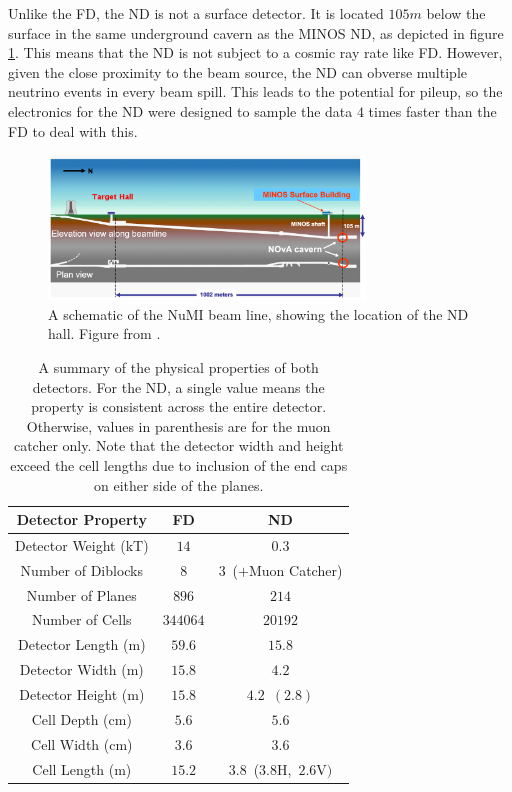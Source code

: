 Unlike the FD, the ND is not a surface detector. It is located $105\unit{m}$ below the surface in the same underground cavern as the MINOS ND, as depicted in figure \ref{fig:DetNDPlan}. This means that the ND is not subject to a cosmic ray rate like FD. However, given the close proximity to the beam source, the ND can obverse multiple neutrino events in every beam spill. This leads to the potential for pileup, so the electronics for the ND were designed to sample the data $4$ times faster than the FD to deal with this.
\begin{figure}[htb]
  \centering
  \includegraphics[width=0.75\textwidth]{figures/DetNDPlan.png}
  \caption[Schematic of the NuMI Beam line]{A schematic of the NuMI beam line, showing the location of the ND hall. Figure from \cite{ref:TDRNOvA}.}
  \label{fig:DetNDPlan}
\end{figure}

\begin{table}[htb]
  \begin{center}
    \begin{tabular}{c c c}
      \hline\hline
      Detector Property & FD & ND \\
      \hline
      Detector Weight (kT) & $14$ & $0.3$ \\
      Number of Diblocks & $8$ & $3$~(${+}$Muon Catcher) \\
      Number of Planes & $896$ & $214$ \\
      Number of Cells & $344064$ & $20192$ \\
      Detector Length (m) & $59.6$ & $15.8$ \\
      Detector Width (m) & $15.8$ & $4.2$ \\
      Detector Height (m) & $15.8$ & $4.2$~$(2.8)$ \\
      Cell Depth (cm) & $5.6$ & $5.6$ \\
      Cell Width (cm) & $3.6$ & $3.6$ \\
      Cell Length (m) & $15.2$ & $3.8$~($3.8$H,~$2.6$V$)$ \\
      \hline
    \end{tabular}
    \caption[Detector Properties]{A summary of the physical properties of both detectors. For the ND, a single value means the property is consistent across the entire detector. Otherwise, values in parenthesis are for the muon catcher only. Note that the detector width and height exceed the cell lengths due to inclusion of the end caps on either side of the planes.}
    \label{tab:Dets}
  \end{center}
\end{table}